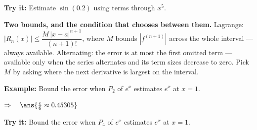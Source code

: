 \documentclass[12pt]{article}
\begin{document}
\begin{tryitbox}
\textbf{Try it:} \quad Estimate $\sin(0.2)$ using terms through $x^{5}$.\\[2pt]
\end{tryitbox}


\begin{formulabox}
\textbf{Two bounds, and the condition that chooses between them.} Lagrange: $|R_{n}(x)| \le \dfrac{M\,|x-a|^{n+1}}{(n+1)!}$, where $M$ bounds $\left|f^{(n+1)}\right|$ across the whole interval --- always available. Alternating: the error is at most the first omitted term --- available only when the series alternates and its term sizes decrease to zero. Pick $M$ by asking where the next derivative is largest on the interval.
\end{formulabox}

\begin{examplebox}
\textbf{Example:} \quad Bound the error when $P_{2}$ of $e^{x}$ estimates $e^{x}$ at $x = 1$.

$\Rightarrow\quad \ans{\frac{e}{6} \approx 0.45305}$
\end{examplebox}

\begin{tryitbox}
\textbf{Try it:} \quad Bound the error when $P_{4}$ of $e^{x}$ estimates $e^{x}$ at $x = 1$.\\[2pt]
\end{tryitbox}
\end{document}
